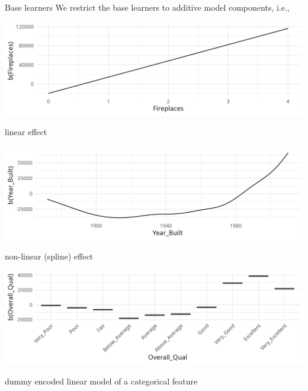 \documentclass[11pt,compress,t,notes=noshow, xcolor=table]{beamer}
\begin{document}
\begin{vbframe}{Base learners}
We restrict the base learners to additive model components, i.e.,
\begin{minipage}{0.4\textwidth}
    \includegraphics[width=\linewidth]{figure/compboost-base-learner-linear.png}
\end{minipage}\hfill
\begin{minipage}{0.5\textwidth}
  linear effect
\end{minipage}

\begin{minipage}{0.4\textwidth}
    \includegraphics[width=\linewidth]{figure/compboost-base-learner-spline.png}
\end{minipage}\hfill
\begin{minipage}{0.5\textwidth}
  non-linear (spline) effect
\end{minipage}

\begin{minipage}{0.4\textwidth}
    \includegraphics[width=\linewidth]{figure/compboost-base-learner-ridge.png}
\end{minipage}\hfill
\begin{minipage}{0.5\textwidth}
  dummy encoded linear model of a categorical feature
\end{minipage}


\end{vbframe}
\end{document}
